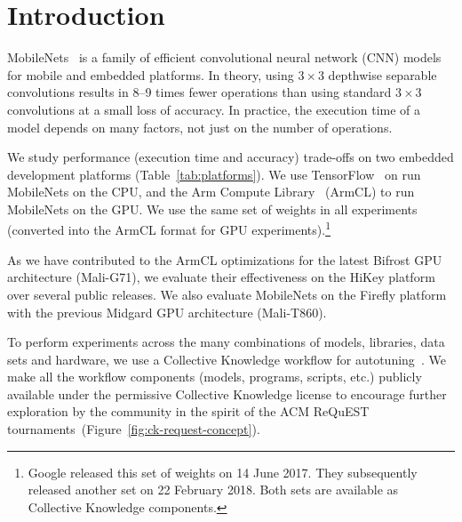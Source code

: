 \documentclass[sigplan]{acmart}
\begin{document}
\maketitle

\section{Introduction}
\label{sec:intro}

MobileNets~\cite{Howard:MobileNets-v1} is a family of efficient convolutional
neural network (CNN) models for mobile and embedded platforms.
%
In theory, using $3 \times 3$ depthwise separable convolutions results in
8--9 times fewer operations than using standard $3 \times 3$ convolutions at a
small loss of accuracy.
%
In practice, the execution time of a model depends on many factors, not
just on the number of operations.

We study performance (execution time and accuracy) trade-offs on two embedded
development platforms (Table~\ref{tab:platforms}).
%
We use TensorFlow~\cite{tensorflow2015-whitepaper} on run MobileNets on the
CPU, and the Arm Compute Library~\cite{arm-compute-library} (ArmCL) to run
MobileNets on the GPU.
%
We use the same set of weights in all experiments (converted into
the ArmCL format for GPU experiments).\footnote{Google released this set of
weights on 14 June 2017. They subsequently released another set on 22 February
2018. Both sets are available as Collective Knowledge components.}

As we have contributed to the ArmCL optimizations for the latest Bifrost GPU
architecture (Mali-G71), we evaluate their effectiveness on the HiKey platform
over several public releases.
%
We also evaluate MobileNets on the Firefly platform with the previous Midgard
GPU architecture (Mali-T860).

To perform experiments across the many combinations of models, libraries, data
sets and hardware, we use a Collective Knowledge workflow for
autotuning~\cite{cm:29db2248aba45e59:c4b24bff57f4ad07}.
%
We make all the workflow components (models, programs, scripts, etc.) publicly
available under the permissive Collective Knowledge license to encourage
further exploration by the community in the spirit of the ACM ReQuEST
tournaments~(Figure~\ref{fig:ck-request-concept}).
\end{document}
